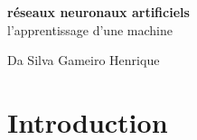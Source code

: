 \documentclass[openany,14pt,fleqn]{book} %
\renewcommand{\headrulewidth}{1pt}
\renewcommand{\footrulewidth}{1pt}
\begin{document}

\begingroup
\thispagestyle{empty}
\centering
\vspace*{5cm}
\par\normalfont\fontsize{35}{35}\sffamily\selectfont
\textbf{réseaux neuronaux artificiels}\\
{\LARGE l'apprentissage d'une machine}\par %
\vspace*{1cm}
{\Huge Da Silva Gameiro Henrique}\par %
\endgroup


\renewcommand{\contentsname}{Table des matières}

\thispagestyle{empty} %
\setcounter{page}{1}
\tableofcontents %


\thispagestyle{fancy}
\fancyhead{}
\fancyfoot{}
\fancyfoot[R]{\thepage}
\fancyhead[L]{\leftmark} %
\renewcommand{\headrulewidth}{1pt}
\renewcommand{\footrulewidth}{0pt} %




\chapter{Introduction}
\end{document}
